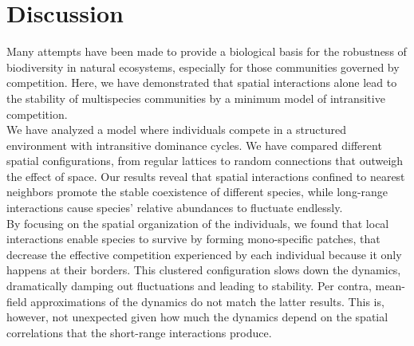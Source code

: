 \section{Discussion}
 \label{chp1:3}

Many attempts have been made to provide a biological basis for the robustness of biodiversity in natural ecosystems, especially for those communities governed by competition. Here, we have demonstrated that spatial interactions alone lead to the stability of multispecies communities by a minimum model of intransitive competition. \\
 
We have analyzed  a model where individuals compete in a structured environment with intransitive dominance cycles. We have compared different spatial configurations, from regular lattices to random connections that outweigh the effect of space. Our results reveal that spatial interactions confined to nearest neighbors promote the stable coexistence of different species, while long-range interactions cause species' relative abundances to fluctuate endlessly. \\

 By focusing on the spatial organization of the individuals, we found that local interactions enable species to survive by forming mono-specific patches, that decrease the effective competition experienced by each individual because it only happens at their borders. This clustered configuration slows down the dynamics, dramatically damping out fluctuations and leading to stability. Per contra, mean-field approximations of the dynamics do not match the latter results. This is, however, not unexpected given how much the dynamics depend on the spatial correlations that the short-range interactions produce. \\




